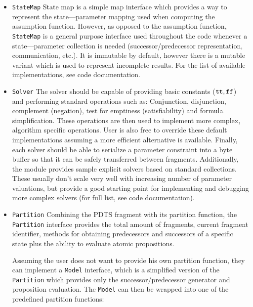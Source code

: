 \begin{itemize}
	\item \texttt{StateMap} State map is a simple map interface which provides a way to represent the state—parameter mapping used when computing the assumption function. However, as opposed to the assumption function, \texttt{StateMap} is a general purpose interface used throughout the code whenever a state—parameter collection is needed (successor/predecessor representation, communication, etc.). It is immutable by default, however there is a mutable variant which is used to represent incomplete results. For the list of available implementations, see code documentation.
	
	\item \texttt{Solver} The solver should be capable of providing basic constants ($\texttt{tt}, \texttt{ff}$) and performing standard operations such as: Conjunction, disjunction, complement (negation), test for emptiness (satisfiability) and formula simplification. These operations are then used to implement more complex, algorithm specific operations. User is also free to override these default implementations assuming a more efficient alternative is available. Finally, each solver should be able to serialize a parameter constraint into a byte buffer so that it can be safely transferred between fragments. Additionally, the module provides sample explicit solvers based on standard collections. These usually don't scale very well with increasing number of parameter valuations, but provide a good starting point for implementing and debugging more complex solvers (for full list, see code documentation).
	
	\item \texttt{Partition} Combining the \ac{PDTS} fragment with its partition function, the \texttt{Partition} interface provides the total amount of fragments, current fragment identifier, methods for obtaining predecessors and successors of a specific state plus the ability to evaluate atomic propositions.
	
	Assuming the user does not want to provide his own partition function, they can implement a \texttt{Model} interface, which is a simplified version of the \texttt{Partition} which provides only the successor/predecessor generator and proposition evaluation. The \texttt{Model} can then be wrapped into one of the predefined partition functions:
	

\end{itemize}
